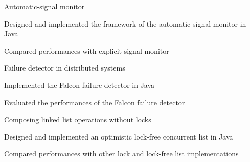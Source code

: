 \begin{myexp}
\begin{myexp}
    \item Automatic-signal monitor 
        \begin{mybullet}
            \item Designed and implemented the framework of the automatic-signal
                monitor in Java
            \item Compared performances with explicit-signal monitor
        \end{mybullet}
    \item Failure detector in distributed systems  
        \begin{mybullet}
            \item Implemented the Falcon failure detector in Java
            \item Evaluated the performances of the Falcon failure detector
    \end{mybullet}
    \end{myexp}
    \begin{myexp}
    \item Composing linked list operations without locks  
        \begin{mybullet}
            \item Designed and implemented an optimistic lock-free concurrent list in Java
            \item Compared performances with other lock and lock-free list implementations
        \end{mybullet}
\end{myexp}

\end{myexp}
